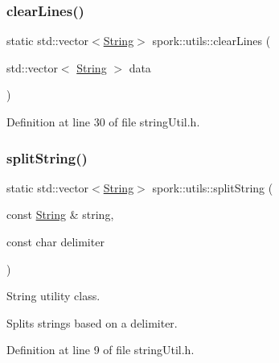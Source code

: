 \subsubsection{\texorpdfstring{clear\+Lines()}{clearLines()}}
{\footnotesize\ttfamily static std\+::vector$<$\hyperlink{my_string_8h_afbeda3fd1bdc8c37d01bdf9f5c8274ff}{String}$>$ spork\+::utils\+::clear\+Lines (\begin{DoxyParamCaption}\item[{std\+::vector$<$ \hyperlink{my_string_8h_afbeda3fd1bdc8c37d01bdf9f5c8274ff}{String} $>$}]{data }\end{DoxyParamCaption})\hspace{0.3cm}{\ttfamily [static]}}



Definition at line 30 of file string\+Util.\+h.

\mbox{\label{namespacespork_1_1utils_ad8d874fadc25e1542d3559f87fe22b69}} 
\subsubsection{\texorpdfstring{split\+String()}{splitString()}}
{\footnotesize\ttfamily static std\+::vector$<$\hyperlink{my_string_8h_afbeda3fd1bdc8c37d01bdf9f5c8274ff}{String}$>$ spork\+::utils\+::split\+String (\begin{DoxyParamCaption}\item[{const \hyperlink{my_string_8h_afbeda3fd1bdc8c37d01bdf9f5c8274ff}{String} \&}]{string,  }\item[{const char}]{delimiter }\end{DoxyParamCaption})\hspace{0.3cm}{\ttfamily [static]}}



String utility class. 

Splits strings based on a delimiter. 

Definition at line 9 of file string\+Util.\+h.

